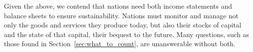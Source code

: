 Given the above, we contend that nations need both 
income statements and
balance sheets
to ensure sustainability. 
Nations must monitor and manage not only the goods and services they produce today, 
but also their stocks of capital 
and the state of that capital, their bequest to the future. 
Many questions, such as those found in Section~\ref{sec:what_to_count},
are unanswerable without both.

\vspace{10 mm}

% 
% 
